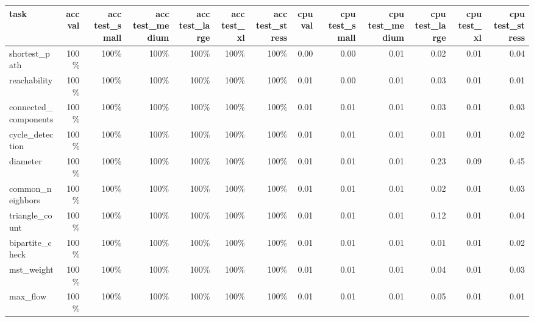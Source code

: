 \begin{tabular}{lrrrrrrrrrrrr}
\toprule
task & acc val & acc test\_small & acc test\_medium & acc test\_large & acc test\_xl & acc test\_stress & cpu val & cpu test\_small & cpu test\_medium & cpu test\_large & cpu test\_xl & cpu test\_stress \\
\midrule
shortest\_path & 100\% & 100\% & 100\% & 100\% & 100\% & 100\% & 0.00 & 0.00 & 0.01 & 0.02 & 0.01 & 0.04 \\
reachability & 100\% & 100\% & 100\% & 100\% & 100\% & 100\% & 0.01 & 0.00 & 0.01 & 0.03 & 0.01 & 0.01 \\
connected\_components & 100\% & 100\% & 100\% & 100\% & 100\% & 100\% & 0.01 & 0.01 & 0.01 & 0.03 & 0.01 & 0.03 \\
cycle\_detection & 100\% & 100\% & 100\% & 100\% & 100\% & 100\% & 0.01 & 0.01 & 0.01 & 0.01 & 0.01 & 0.02 \\
diameter & 100\% & 100\% & 100\% & 100\% & 100\% & 100\% & 0.01 & 0.01 & 0.01 & 0.23 & 0.09 & 0.45 \\
common\_neighbors & 100\% & 100\% & 100\% & 100\% & 100\% & 100\% & 0.01 & 0.01 & 0.01 & 0.02 & 0.01 & 0.03 \\
triangle\_count & 100\% & 100\% & 100\% & 100\% & 100\% & 100\% & 0.01 & 0.01 & 0.01 & 0.12 & 0.01 & 0.04 \\
bipartite\_check & 100\% & 100\% & 100\% & 100\% & 100\% & 100\% & 0.01 & 0.01 & 0.01 & 0.01 & 0.01 & 0.02 \\
mst\_weight & 100\% & 100\% & 100\% & 100\% & 100\% & 100\% & 0.01 & 0.01 & 0.01 & 0.04 & 0.01 & 0.03 \\
max\_flow & 100\% & 100\% & 100\% & 100\% & 100\% & 100\% & 0.01 & 0.01 & 0.01 & 0.05 & 0.01 & 0.01 \\
\bottomrule
\end{tabular}

